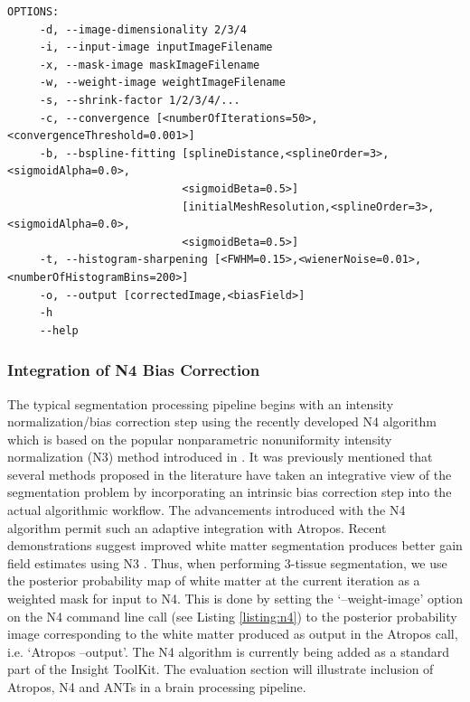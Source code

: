 \documentclass[11pt,english]{article}
\begin{document}
{\begin{command}
\begin{lstlisting}
OPTIONS: 
     -d, --image-dimensionality 2/3/4
     -i, --input-image inputImageFilename
     -x, --mask-image maskImageFilename
     -w, --weight-image weightImageFilename
     -s, --shrink-factor 1/2/3/4/...
     -c, --convergence [<numberOfIterations=50>,<convergenceThreshold=0.001>]
     -b, --bspline-fitting [splineDistance,<splineOrder=3>,<sigmoidAlpha=0.0>,
                           <sigmoidBeta=0.5>]
                           [initialMeshResolution,<splineOrder=3>,<sigmoidAlpha=0.0>,
                           <sigmoidBeta=0.5>]
     -t, --histogram-sharpening [<FWHM=0.15>,<wienerNoise=0.01>,<numberOfHistogramBins=200>]
     -o, --output [correctedImage,<biasField>]
     -h 
     --help 
\end{lstlisting} 
\end{command}
\subsubsection{Integration of N4 Bias Correction}
The typical segmentation processing pipeline begins with an intensity
normalization/bias correction step using the recently developed N4
algorithm \citep{Tustison2010} which is based on the popular
nonparametric nonuniformity intensity normalization (N3) method
introduced in \cite{Sled1998}.  It was previously mentioned that
several methods proposed in the literature have taken an integrative
view of the segmentation problem by incorporating an intrinsic bias
correction step into the actual algorithmic workflow.  The
advancements introduced with the N4 algorithm permit such an adaptive
integration with Atropos.  Recent demonstrations suggest improved
white matter segmentation produces better gain field estimates using
N3 \citep{Boyes2008}.  Thus, when performing 3-tissue segmentation, we
use the posterior probability map of white matter at the current
iteration as a weighted mask for input to N4.  This is done by setting
the `{\ttfamily --weight-image}' option on the N4 command line call
(see Listing \ref{listing:n4}) to the posterior probability image
corresponding to the white matter produced as output in the Atropos
call, i.e. `{\ttfamily Atropos --output}'.  The N4 algorithm is
currently being added as a standard part of the Insight ToolKit.  The
evaluation section will illustrate inclusion of Atropos, N4 and ANTs
in a brain processing pipeline. 

}
\end{document}
